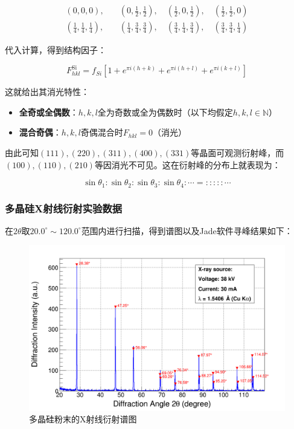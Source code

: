 \documentclass{thuemp}
\begin{document}
\begin{align*}
(0,0,0),\quad &(0,\frac{1}{2},\frac{1}{2}),\quad (\frac{1}{2},0,\frac{1}{2}),\quad (\frac{1}{2},\frac{1}{2},0) \\
(\frac{1}{4},\frac{1}{4},\frac{1}{4}),\quad &(\frac{1}{4},\frac{3}{4},\frac{3}{4}),\quad (\frac{3}{4},\frac{1}{4},\frac{3}{4}),\quad (\frac{3}{4},\frac{3}{4},\frac{1}{4})
\end{align*}

代入计算，得到结构因子：

\begin{equation}
    F_{hkl}^{\text{Si}} = f_{Si} \left[1 + e^{\pi i (h+k)} + e^{\pi i (h+l)} + e^{\pi i (k+l)}\right]
    \label{eq:si_struct_fac}
\end{equation}

这就给出其消光特性：

\begin{itemize}
    \item \textbf{全奇或全偶数}：$h,k,l$全为奇数或全为偶数时（以下均假定$h,k,l \in \mathbb{N}$）
    \begin{itemize}
    \end{itemize}
    \item \textbf{混合奇偶}：$h,k,l$奇偶混合时$F_{hkl}=0$（消光）
\end{itemize}

由此可知$(111), (220), (311), (400), (331)$等晶面可观测衍射峰，而$(100), (110), (210)$等因消光不可见。这在衍射峰的分布上就表现为：

\begin{equation}
    \sin{\theta_1} : \sin{\theta_2} :\sin{\theta_3} : \sin{\theta_4} : \cdots = 
    : : : : : \cdots
\label{eq:si_diff_patt}
\end{equation}

\subsubsection{多晶硅X射线衍射实验数据}

在$2\theta$取$20.0^\circ \sim 120.0^\circ$范围内进行扫描，得到谱图以及Jade软件寻峰结果如下：

\begin{figure}[H]
    \centering
    \includegraphics[options]{../Data/Silicon-multi.png}
    \caption{多晶硅粉末的X射线衍射谱图}
    \label{fig:si_xrd}    
\end{figure}
\end{document}

